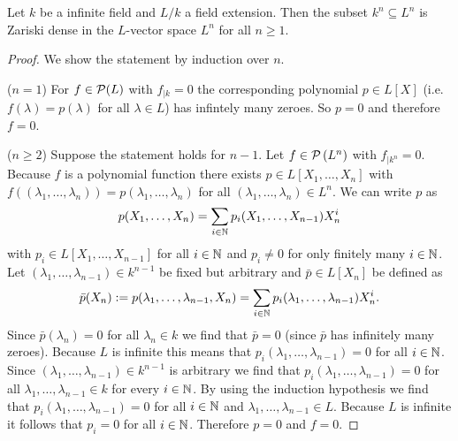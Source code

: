 \begin{lem}
 Let $k$ be a infinite field and $L/k$ a field extension. Then the subset $k^n \subseteq L^n$ is Zariski dense in the $L$-vector space $L^n$ for all $n \geq 1$.
\end{lem}
\begin{proof}
 We show the statement by induction over $n$.
 
 ($n = 1$) For $f \in \mathcal{P}(L)$ with $f_{|k} = 0$ the corresponding polynomial $p \in L[X]$ (i.e. $f(\lambda) = p(\lambda)$ for all $\lambda \in L$) has infintely many zeroes. So $p = 0$ and therefore $f = 0$.
 
 ($n \geq 2$) Suppose the statement holds for $n-1$. Let $f \in \mathcal{P}\left(L^n\right)$ with $f_{|k^n} = 0$. Because $f$ is a polynomial function there exists $p \in L[X_1, \ldots, X_n]$ with $f((\lambda_1, \ldots, \lambda_n)) = p(\lambda_1, \ldots, \lambda_n)$ for all $(\lambda_1, \ldots, \lambda_n) \in L^n$. We can write $p$ as
 \[
  p(X_1, \ldots, X_n) = \sum_{i \in \mathbb{N}} p_i(X_1, \ldots, X_{n-1}) X_n^i
 \]
 with $p_i \in L[X_1, \ldots, X_{n-1}]$ for all $i \in \mathbb{N}$ and $p_i \neq 0$ for only finitely many $i \in \mathbb{N}$. Let $(\lambda_1, \ldots, \lambda_{n-1}) \in k^{n-1}$ be fixed but arbitrary and $\bar{p} \in L[X_n]$ be defined as
 \[
  \bar{p}(X_n) := p(\lambda_1, \ldots, \lambda_{n-1}, X_n) = \sum_{i \in \mathbb{N}} p_i(\lambda_1, \ldots, \lambda_{n-1}) X_n^i.
 \]
 Since $\bar{p}(\lambda_n) = 0$ for all $\lambda_n \in k$ we find that $\bar{p} = 0$ (since $\bar{p}$ has infinitely many zeroes). Because $L$ is infinite this means that $p_i(\lambda_1, \ldots, \lambda_{n-1}) = 0$ for all $i \in \mathbb{N}$. Since $(\lambda_1, \ldots, \lambda_{n-1}) \in k^{n-1}$ is arbitrary we find that $p_i(\lambda_1, \ldots, \lambda_{n-1}) = 0$ for all $\lambda_1, \ldots, \lambda_{n-1} \in k$ for every $i \in \mathbb{N}$. By using the induction hypothesis we find that $p_i(\lambda_1, \ldots, \lambda_{n-1}) = 0$ for all $i \in \mathbb{N}$ and $\lambda_1, \ldots, \lambda_{n-1} \in L$. Because $L$ is infinite it follows that $p_i = 0$ for all $i \in \mathbb{N}$. Therefore $p = 0$ and $f = 0$.
\end{proof}























